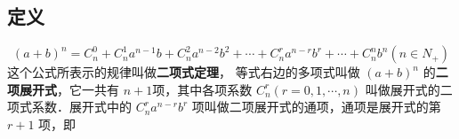 
\begin{issues}
\issueDraft
\end{issues}

\subsection{定义}
\begin{equation}
(a + b)^n = C_n^0 + C_n^1a^{n- 1}b + C_n^2a^{n- 2}b^2 + \cdots + C_n^ra^{n-r}b^r + \cdots + C_n^nb^n(n\in N_{+})
\end{equation}
这个公式所表示的规律叫做\textbf{二项式定理}，
等式右边的多项式叫做 $(a+b)^n$ 的\textbf{二项展开式}，它一共有 $n+1$项，其中各项系数 $C_n^r(r = 0, 1, \cdots, n)$ 叫做展开式的二项式系数．展开式中的 $C_n^ra^{n-r}b^r$ 项叫做二项展开式的通项，通项是展开式的第 $r+1$ 项，即